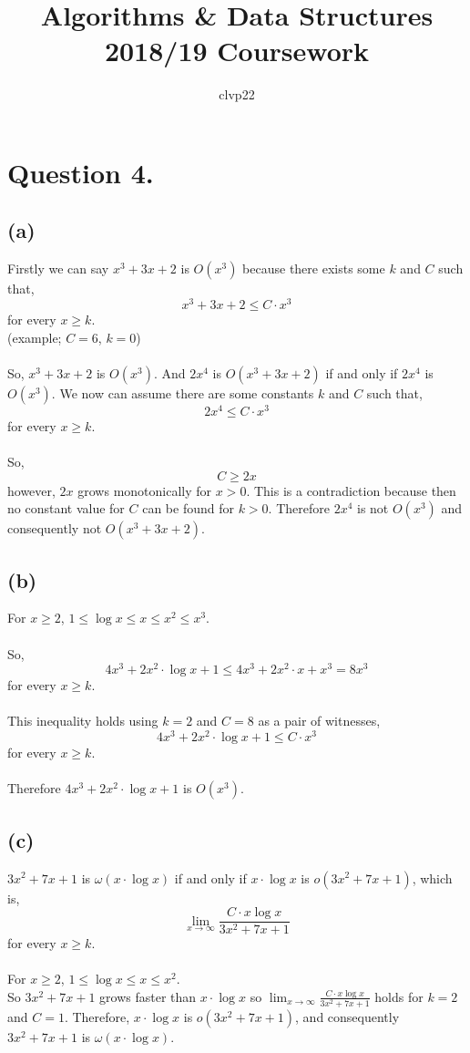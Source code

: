 \documentclass[]{article}
\title{Algorithms \& Data Structures 2018/19 Coursework}
\author{clvp22}
\begin{document}
\maketitle

\section*{Question 4.}
\subsection*{(a)}
Firstly we can say $x^3+3x +2$ is $O(x^3)$ because there exists some $k$ and $C$ such that,
$$x^3+3x+2 \leq C \cdot x^3 $$
for every $x \geq k$.
\\
(example; $C=6$, $k=0$)
\\
\\
So, $x^3+3x +2$ is $O(x^3)$. And $2x^4$ is $O(x^3+3x +2)$ if and only if $2x^4$ is $O(x^3)$. We now can assume there are some constants $k$ and $C$ such that,
$$2x^4 \leq C \cdot x^3$$
for every $x \geq k$.
\\
\\
So,
$$ C \geq 2x$$
however, $2x$ grows monotonically for $x > 0$. This is a contradiction because then no constant value for $C$ can be found for $k>0$. Therefore $2x^4$ is not $O(x^3)$ and consequently not $O(x^3+3x +2)$.
\subsection*{(b)}
For $x \geq 2$, $1 \leq \log x \leq x \leq x^2 \leq x^3$.
\\
\\
So,
$$4x^3+2x^2 \cdot \log x +1 \leq 4x^3+2x^2 \cdot x + x^3 = 8x^3$$
for every $x \geq k$.
\\
\\
This inequality holds using $k=2$ and $C=8$ as a pair of witnesses,
$$4x^3 +2x^2 \cdot \log x +1 \leq C \cdot x^3 $$
for every $x \geq k$.
\\
\\
Therefore $4x^3+2x^2 \cdot \log x +1$ is $O(x^3)$.
\subsection*{(c)}
$3x^2+7x+1$ is $\omega (x \cdot \log x)$ if and only if $x \cdot \log x$ is $o(3x^2+7x+1)$, which is,
$$\displaystyle{\lim_{x \to \infty}} \frac{C \cdot x \log x}{3x^2+7x+1}$$
for every $x \geq k$.
\\
\\
For $x \geq 2$, $1 \leq \log x \leq x \leq x^2$. 
\\
So $3x^2+7x+1$ grows faster than $x \cdot \log x$ so $\displaystyle{\lim_{x \to \infty}} \frac{C \cdot x \log x}{3x^2+7x+1}$ holds for $k = 2$ and $C=1$. Therefore, $x \cdot \log x$ is $o(3x^2+7x+1)$, and consequently $3x^2+7x+1$ is $\omega (x \cdot \log x)$.
\end{document}
